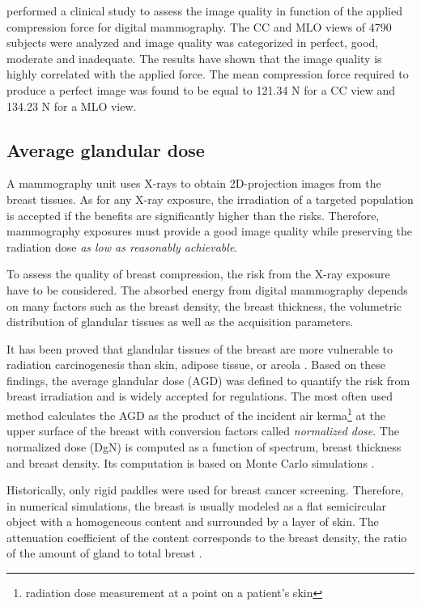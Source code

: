 \cite{oleary_compression_2011} performed a clinical study to assess the image quality in function of the applied compression force for digital mammography. The CC and MLO views of 4790 subjects were analyzed and image quality was categorized in  perfect, good, moderate and
inadequate. The results have shown that the image quality is highly correlated with the applied force. The mean compression force required to produce a perfect image was found to be equal to 121.34 N for a CC view and 134.23 N for a MLO view.

\subsection{Average glandular dose}
A mammography unit uses X-rays to obtain 2D-projection images from the breast tissues. As for any X-ray exposure, the irradiation of a targeted population is accepted if the benefits are significantly higher than the risks. Therefore,  mammography exposures must provide a good image quality while preserving the radiation dose \textit{as low as reasonably achievable}.

To assess the quality of breast compression, the risk from the X-ray exposure have to be considered.  The absorbed energy from digital mammography depends on many factors such as the breast density, the breast thickness, the volumetric distribution of glandular tissues as well as the acquisition parameters. 

It has been proved that glandular tissues of the breast are more vulnerable to radiation carcinogenesis than skin, adipose tissue, or areola \citep{richard_absorbed_1979}. Based on these findings, the average glandular dose (AGD) was defined to quantify the risk from breast irradiation and is widely accepted for regulations.  The most often used method calculates the AGD as the product of the incident air kerma\footnote{radiation dose measurement at a point on a patient's skin} at the upper surface of the breast with conversion factors called \textit{normalized dose}. The normalized dose (DgN)  is computed as a function of spectrum, breast thickness and breast density.  Its computation is based on Monte Carlo simulations \citep{dance_additional_2000,boone_glandular_1999}. 

Historically, only rigid paddles were used for breast cancer screening. Therefore, in numerical simulations, the breast is usually modeled as a flat semicircular object with a homogeneous content and surrounded by a layer of skin. The attenuation coefficient of the content corresponds to the breast density, the ratio of the amount of gland to total breast \citep{dance_additional_2000}.

